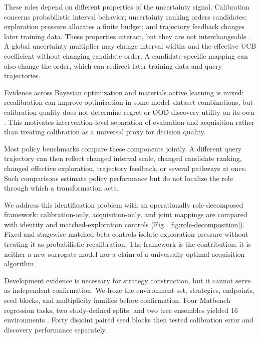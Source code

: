 \documentclass[10pt,twocolumn]{article}
\begin{document}
These roles depend on different properties of the uncertainty signal.
Calibration concerns probabilistic interval behavior; uncertainty ranking
orders candidates; exploration pressure allocates a finite budget; and
trajectory feedback changes later training data. These properties interact,
but they are not interchangeable
\citep{gneiting2007proper,kuleshov2018calibrated,guo2017calibration,angelopoulos2023conformal,mandi2022decision,wilder2019decision,donti2017task}.
A global uncertainty multiplier may change interval widths and the effective
UCB coefficient without changing candidate order. A candidate-specific
mapping can also change the order, which can redirect later training data and
query trajectories.


Evidence across Bayesian optimization and materials active learning is mixed:
recalibration can improve optimization in some model--dataset combinations,
but calibration quality does not determine regret or OOD discovery utility on
its own \citep{foldager2023uncertainty,jiang2026calibration,dale2025ood}.
This motivates intervention-level separation of evaluation and acquisition
rather than treating calibration as a universal proxy for decision quality.

Most policy benchmarks compare these components jointly. A different query
trajectory can then reflect changed interval scale, changed candidate ranking,
changed effective exploration, trajectory feedback, or several pathways at
once. Such comparisons estimate policy performance but do not localize the
role through which a transformation acts.

We address this identification problem with an operationally role-decomposed
framework: calibration-only, acquisition-only, and joint mappings are compared
with identity and matched-exploration controls
(Fig.~\ref{fig:role-decomposition}). Fixed and stagewise matched-beta controls
isolate exploration pressure without treating it as probabilistic
recalibration. The framework is the contribution; it is neither a new
surrogate model nor a claim of a universally optimal acquisition algorithm.

Development evidence is necessary for strategy construction, but it cannot
serve as independent confirmation. We froze the environment set, strategies,
endpoints, seed blocks, and multiplicity families before confirmation. Four
Matbench regression tasks, two study-defined splits, and two tree ensembles
yielded 16 environments
\citep{dunn2020matbench,ward2018matminer,butler2018mlmaterials}.
Forty disjoint paired seed blocks then tested calibration error and discovery
performance separately.
\end{document}
